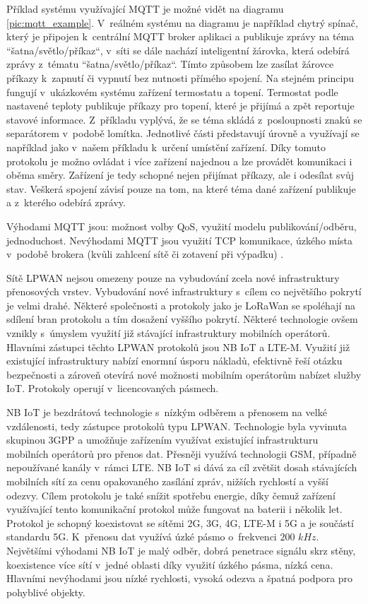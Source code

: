 Příklad systému využívající MQTT je možné vidět na diagramu \ref{pic:mqtt_example}. V~reálném systému na diagramu je například chytrý spínač, který je připojen k~centrální MQTT broker aplikaci a publikuje zprávy na téma “šatna/světlo/příkaz“, v~síti se dále nachází inteligentní žárovka, která odebírá zprávy z~tématu “šatna/světlo/příkaz“. Tímto způsobem lze zasílat žárovce příkazy k~zapnutí či vypnutí bez nutnosti přímého spojení. Na stejném principu fungují v~ukázkovém systému zařízení termostatu a topení. Termostat podle nastavené teploty publikuje příkazy pro topení, které je přijímá a zpět reportuje stavové informace. Z~příkladu vyplývá, že se téma skládá z~posloupnosti znaků se separátorem v~podobě lomítka. Jednotlivé části představují úrovně a využívají se například jako v~našem příkladu k~určení umístění zařízení. Díky tomuto protokolu je možno ovládat i více zařízení najednou a lze provádět komunikaci i oběma směry. Zařízení je tedy schopné nejen přijímat příkazy, ale i odesílat svůj stav. Veškerá spojení závisí pouze na tom, na které téma dané zařízení publikuje a z~kterého odebírá zprávy.

Výhodami MQTT jsou: možnost volby QoS, využití modelu publikování/odběru, jednoduchost. Nevýhodami MQTT jsou využití TCP komunikace, úzkého místa v~podobě brokera (kvůli zahlcení sítě či zotavení při výpadku) \cite{ccorak2018comparative_POV2}.

 \label{sec:mobile_network}
Sítě LPWAN nejsou omezeny pouze na vybudování zcela nové infrastruktury přenosových vrstev. Vybudování nové infrastruktury s~cílem co největšího pokrytí je velmi drahé. Některé společnosti a protokoly jako je LoRaWan se spoléhají na sdílení bran protokolu a tím dosažení vyššího pokrytí. Některé technologie ovšem vznikly s~úmyslem využití již stávající infrastruktury mobilních operátorů. Hlavními zástupci těchto LPWAN protokolů jsou NB IoT a LTE-M. Využití již existující infrastruktury nabízí enormní úsporu nákladů, efektivně řeší otázku bezpečnosti a zároveň otevírá nové možnosti mobilním operátorům nabízet služby IoT. Protokoly operují v~licencovaných pásmech.


NB IoT je bezdrátová technologie s~nízkým odběrem a přenosem na velké vzdálenosti, tedy zástupce protokolů typu LPWAN. Technologie byla vyvinuta skupinou 3GPP a umožňuje zařízením využívat existující infrastrukturu mobilních operátorů pro přenos dat. Přesněji využívá technologii GSM, případně nepoužívané kanály v~rámci LTE. NB IoT si dává za cíl zvětšit dosah stávajících mobilních sítí za cenu opakovaného zasílání zpráv, nižších rychlostí a vyšší odezvy. Cílem protokolu je také snížit spotřebu energie, díky čemuž zařízení využívající tento komunikační protokol může fungovat na baterii i několik let. Protokol je schopný koexistovat se sítěmi 2G, 3G, 4G, LTE-M i 5G a je součástí standardu 5G. K~přenosu dat využívá úzké pásmo o~frekvenci $200$ $kHz$. Největšími výhodami NB IoT je malý odběr, dobrá penetrace signálu skrz stěny, koexistence více sítí v~jedné oblasti díky využití úzkého pásma, nízká cena. Hlavními nevýhodami jsou nízké rychlosti, vysoká odezva a špatná podpora pro pohyblivé objekty. \cite{NB_IOT}


